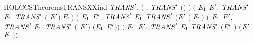 \begin{SaveVerbatim}{HOLCCSTheoremsTRANSXXind}
\HOLTokenTurnstile{} \HOLSymConst{\HOLTokenForall{}}\ensuremath{\HOLBoundVar{TRANS}\sp{\prime{}}}.
     \ensuremath{(}\HOLSymConst{\HOLTokenForall{}} . \ensuremath{\HOLBoundVar{TRANS}\sp{\prime{}}} \ensuremath{(}\HOLSymConst{\ensuremath{\ldotp}}\ensuremath{)}  \ensuremath{)} \HOLSymConst{\HOLTokenConj{}}
     \ensuremath{(}\HOLSymConst{\HOLTokenForall{}}  \ensuremath{\HOLBoundVar{E}\sb{\mathrm{1}}} \ensuremath{\HOLBoundVar{E}\sp{\prime{}}}. \ensuremath{\HOLBoundVar{TRANS}\sp{\prime{}}}   \ensuremath{\HOLBoundVar{E}\sb{\mathrm{1}}} \HOLSymConst{\HOLTokenImp{}} \ensuremath{\HOLBoundVar{TRANS}\sp{\prime{}}} \ensuremath{(} \HOLSymConst{\ensuremath{+}} \ensuremath{\HOLBoundVar{E}\sp{\prime{}}}\ensuremath{)}  \ensuremath{\HOLBoundVar{E}\sb{\mathrm{1}}}\ensuremath{)} \HOLSymConst{\HOLTokenConj{}}
     \ensuremath{(}\HOLSymConst{\HOLTokenForall{}}  \ensuremath{\HOLBoundVar{E}\sb{\mathrm{1}}} \ensuremath{\HOLBoundVar{E}\sp{\prime{}}}. \ensuremath{\HOLBoundVar{TRANS}\sp{\prime{}}}   \ensuremath{\HOLBoundVar{E}\sb{\mathrm{1}}} \HOLSymConst{\HOLTokenImp{}} \ensuremath{\HOLBoundVar{TRANS}\sp{\prime{}}} \ensuremath{(}\ensuremath{\HOLBoundVar{E}\sp{\prime{}}} \HOLSymConst{\ensuremath{+}} \ensuremath{)}  \ensuremath{\HOLBoundVar{E}\sb{\mathrm{1}}}\ensuremath{)} \HOLSymConst{\HOLTokenConj{}}
     \ensuremath{(}\HOLSymConst{\HOLTokenForall{}}  \ensuremath{\HOLBoundVar{E}\sb{\mathrm{1}}} \ensuremath{\HOLBoundVar{E}\sp{\prime{}}}. \ensuremath{\HOLBoundVar{TRANS}\sp{\prime{}}}   \ensuremath{\HOLBoundVar{E}\sb{\mathrm{1}}} \HOLSymConst{\HOLTokenImp{}} \ensuremath{\HOLBoundVar{TRANS}\sp{\prime{}}} \ensuremath{(} \HOLSymConst{\ensuremath{\mid}} \ensuremath{\HOLBoundVar{E}\sp{\prime{}}}\ensuremath{)}  \ensuremath{(}\ensuremath{\HOLBoundVar{E}\sb{\mathrm{1}}} \HOLSymConst{\ensuremath{\mid}} \ensuremath{\HOLBoundVar{E}\sp{\prime{}}}\ensuremath{)}\ensuremath{)} \HOLSymConst{\HOLTokenConj{}}
     \ensuremath{(}\HOLSymConst{\HOLTokenForall{}}  \ensuremath{\HOLBoundVar{E}\sb{\mathrm{1}}} \ensuremath{\HOLBoundVar{E}\sp{\prime{}}}. \ensuremath{\HOLBoundVar{TRANS}\sp{\prime{}}}   \ensuremath{\HOLBoundVar{E}\sb{\mathrm{1}}} \HOLSymConst{\HOLTokenImp{}} \ensuremath{\HOLBoundVar{TRANS}\sp{\prime{}}} \ensuremath{(}\ensuremath{\HOLBoundVar{E}\sp{\prime{}}} \HOLSymConst{\ensuremath{\mid}} \ensuremath{)}  \ensuremath{(}\ensuremath{\HOLBoundVar{E}\sp{\prime{}}} \HOLSymConst{\ensuremath{\mid}} \ensuremath{\HOLBoundVar{E}\sb{\mathrm{1}}}\ensuremath{)}\ensuremath{)} \HOLSymConst{\HOLTokenConj{}}

\end{SaveVerbatim}
